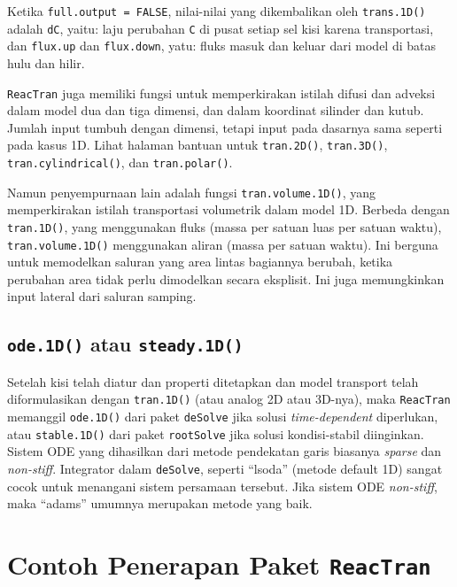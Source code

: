\documentclass[]{book}
\theoremstyle{definition}
\theoremstyle{definition}
\theoremstyle{definition}
\theoremstyle{remark}
\begin{document}
Ketika \texttt{full.output\ =\ FALSE}, nilai-nilai yang dikembalikan oleh \texttt{trans.1D()} adalah \texttt{dC}, yaitu: laju perubahan \texttt{C} di pusat setiap sel kisi karena transportasi, dan \texttt{flux.up} dan \texttt{flux.down}, yatu: fluks masuk dan keluar dari model di batas hulu dan hilir.

\texttt{ReacTran} juga memiliki fungsi untuk memperkirakan istilah difusi dan adveksi dalam model dua dan tiga dimensi, dan dalam koordinat silinder dan kutub. Jumlah input tumbuh dengan dimensi, tetapi input pada dasarnya sama seperti pada kasus 1D. Lihat halaman bantuan untuk \texttt{tran.2D()}, \texttt{tran.3D()}, \texttt{tran.cylindrical()}, dan \texttt{tran.polar()}.

Namun penyempurnaan lain adalah fungsi \texttt{tran.volume.1D()}, yang memperkirakan istilah transportasi volumetrik dalam model 1D. Berbeda dengan \texttt{tran.1D()}, yang menggunakan fluks (massa per satuan luas per satuan waktu), \texttt{tran.volume.1D()} menggunakan aliran (massa per satuan waktu). Ini berguna untuk memodelkan saluran yang area lintas bagiannya berubah, ketika perubahan area tidak perlu dimodelkan secara eksplisit. Ini juga memungkinkan input lateral dari saluran samping.

\hypertarget{ode.1d-atau-steady.1d}{%
\subsection{\texorpdfstring{\texttt{ode.1D()} atau \texttt{steady.1D()}}{ode.1D() atau steady.1D()}}\label{ode.1d-atau-steady.1d}}

Setelah kisi telah diatur dan properti ditetapkan dan model transport telah diformulasikan dengan \texttt{tran.1D()} (atau analog 2D atau 3D-nya), maka \texttt{ReacTran} memanggil \texttt{ode.1D()} dari paket \texttt{deSolve} jika solusi \emph{time-dependent} diperlukan, atau \texttt{stable.1D()} dari paket \texttt{rootSolve} jika solusi kondisi-stabil diinginkan. Sistem ODE yang dihasilkan dari metode pendekatan garis biasanya \emph{sparse} dan \emph{non-stiff}. Integrator dalam \texttt{deSolve}, seperti ``lsoda'' (metode default 1D) sangat cocok untuk menangani sistem persamaan tersebut. Jika sistem ODE \emph{non-stiff}, maka ``adams'' umumnya merupakan metode yang baik.

\hypertarget{contoh-penerapan-paket-reactran}{%
\section{\texorpdfstring{Contoh Penerapan Paket \texttt{ReacTran}}{Contoh Penerapan Paket ReacTran}}\label{contoh-penerapan-paket-reactran}}
\end{document}
